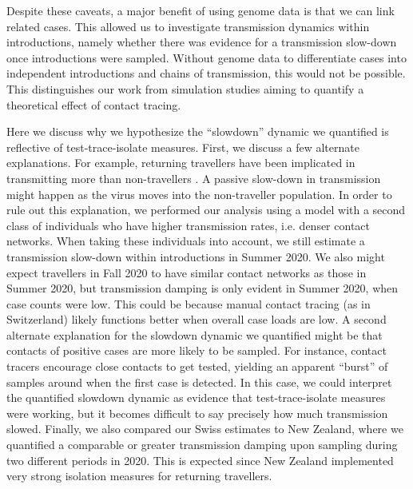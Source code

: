 \documentclass[9pt,twoside,lineno]{pnas-new} %
\begin{document}
Despite these caveats, a major benefit of using genome data is that we can link related cases. This allowed us to investigate transmission dynamics within introductions, namely whether there was evidence for a transmission slow-down once introductions were sampled. Without genome data to differentiate cases into independent introductions and chains of transmission, this would not be possible. This distinguishes our work from simulation studies aiming to quantify a theoretical effect of contact tracing. 

Here we discuss why we hypothesize the ``slowdown'' dynamic we quantified is reflective of test-trace-isolate measures. First, we discuss a few alternate explanations. For example, returning travellers have been implicated in transmitting more than non-travellers \cite{Hodcroft2021}. A passive slow-down in transmission might happen as the virus moves into the non-traveller population. In order to rule out this explanation, we performed our analysis using a model with a second class of individuals who have higher transmission rates, i.e. denser contact networks. When taking these individuals into account, we still estimate a transmission slow-down within introductions in Summer 2020. We also might expect travellers in Fall 2020 to have similar contact networks as those in Summer 2020, but transmission damping is only evident in Summer 2020, when case counts were low. This could be because manual contact tracing (as in Switzerland) likely functions better when overall case loads are low. A second alternate explanation for the slowdown dynamic we quantified might be that contacts of positive cases are more likely to be sampled. For instance, contact tracers encourage close contacts to get tested, yielding an apparent ``burst'' of samples around when the first case is detected. In this case, we could interpret the quantified slowdown dynamic as evidence that test-trace-isolate measures were working, but it becomes difficult to say precisely how much transmission slowed. Finally, we also compared our Swiss estimates to New Zealand, where we quantified a comparable or greater transmission damping upon sampling during two different periods in 2020. This is expected since New Zealand implemented very strong isolation measures for returning travellers.
\end{document}
